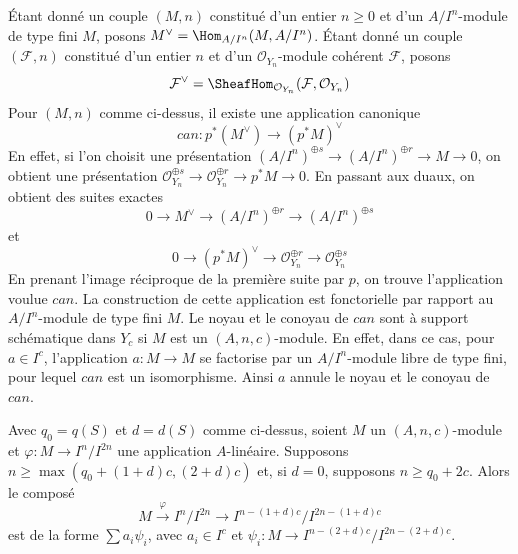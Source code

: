 \begin{remark}
\label{remark-duals}
Étant donné un couple $(M, n)$ constitué d'un entier $n \geq 0$ et d'un $A/I^n$-module de type fini $M$, posons $M^\vee = \Hom_{A/I^n}(M, A/I^n)$. Étant donné un couple $(\mathcal{F}, n)$ constitué d'un entier $n$ et d'un $\mathcal{O}_{Y_n}$-module cohérent $\mathcal{F}$, posons
$$
\mathcal{F}^\vee =
\SheafHom_{\mathcal{O}_{Y_n}}(\mathcal{F}, \mathcal{O}_{Y_n})
$$
Pour $(M, n)$ comme ci-dessus, il existe une application canonique
$$
can : p^*(M^\vee) \longrightarrow (p^*M)^\vee
$$
En effet, si l'on choisit une présentation $(A/I^n)^{\oplus s} \to (A/I^n)^{\oplus r} \to M \to 0$, on obtient une présentation $\mathcal{O}_{Y_n}^{\oplus s} \to \mathcal{O}_{Y_n}^{\oplus r} \to
p^*M \to 0$. En passant aux duaux, on obtient des suites exactes
$$
0 \to M^\vee \to (A/I^n)^{\oplus r} \to (A/I^n)^{\oplus s}
$$
et
$$
0 \to (p^*M)^\vee \to
\mathcal{O}_{Y_n}^{\oplus r} \to
\mathcal{O}_{Y_n}^{\oplus s}
$$
En prenant l'image réciproque de la première suite par $p$, on trouve l'application voulue $can$. La construction de cette application est fonctorielle par rapport au $A/I^n$-module de type fini $M$. Le noyau et le conoyau de $can$ sont à support schématique dans $Y_c$ si $M$ est un $(A, n, c)$-module. En effet, dans ce cas, pour $a \in I^c$, l'application $a : M \to M$ se factorise par un $A/I^n$-module libre de type fini, pour lequel $can$ est un isomorphisme. Ainsi $a$ annule le noyau et le conoyau de $can$.
\end{remark}

\begin{lemma}
\label{lemma-factor-hom}
Avec $q_0 = q(S)$ et $d = d(S)$ comme ci-dessus, soient $M$ un $(A, n, c)$-module et $\varphi : M \to I^n/I^{2n}$ une application $A$-linéaire. Supposons $n \geq \max(q_0 + (1 + d)c, (2 + d)c)$ et, si $d = 0$, supposons $n \geq q_0 + 2c$. Alors le composé
$$
M \xrightarrow{\varphi} I^n/I^{2n} \to
I^{n - (1 + d)c}/I^{2n - (1 + d)c}
$$
est de la forme $\sum a_i \psi_i$, avec $a_i \in I^c$ et $\psi_i : M \to I^{n - (2 + d)c}/I^{2n - (2 + d)c}$.
\end{lemma}

